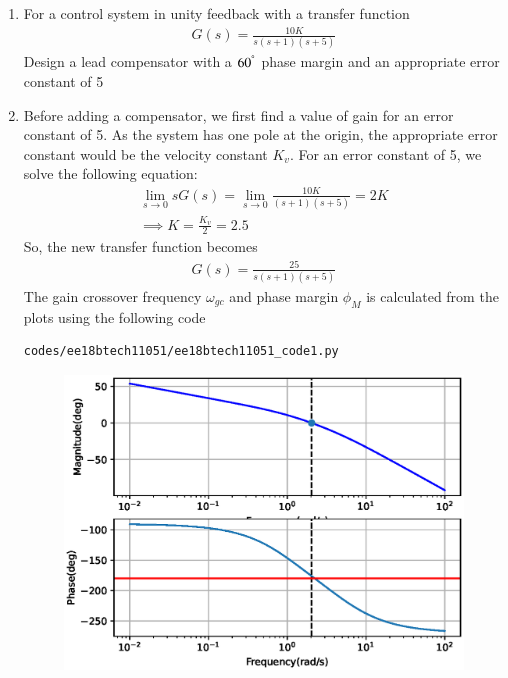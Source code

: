 \begin{enumerate}[label=\thesection.\arabic*.,ref=\thesection.\theenumi]

\item

For a control system in unity feedback with a transfer function
\begin{align}
    G(s) = \frac{10K}{s(s+1)(s+5)}
\end{align}
Design a lead compensator with a $60^{\degree}$ phase margin and an appropriate error constant of 5

\item
\solution
Before adding a compensator, we first find a value of gain for an error constant of 5. As the system has one pole at the origin, the appropriate error constant would be the velocity constant $K_{v}$. For an error constant of 5, we solve the following equation:
\begin{align}
    \lim_{s \to 0} s G(s) = \lim_{s \to 0} \frac{10K}{(s+1)(s+5)} = 2K\\
    \implies K = \frac{K_{v}}{2} = 2.5
\end{align}
So, the new transfer function becomes
\begin{align}
    G(s) = \frac{25}{s(s+1)(s+5)}
\end{align}
The gain crossover frequency $ \omega_{gc} $ and phase margin $ \phi_{M} $ is calculated from the plots using the following code
\begin{lstlisting}
codes/ee18btech11051/ee18btech11051_code1.py
\end{lstlisting}

\begin{figure}[!ht]
    \centering
    \includegraphics[width=\columnwidth]{./figs/ee18btech11051/ee18btech11051_fig1.eps}
    \label{fig:ee18btech11051_1}
\end{figure}


\end{enumerate}

